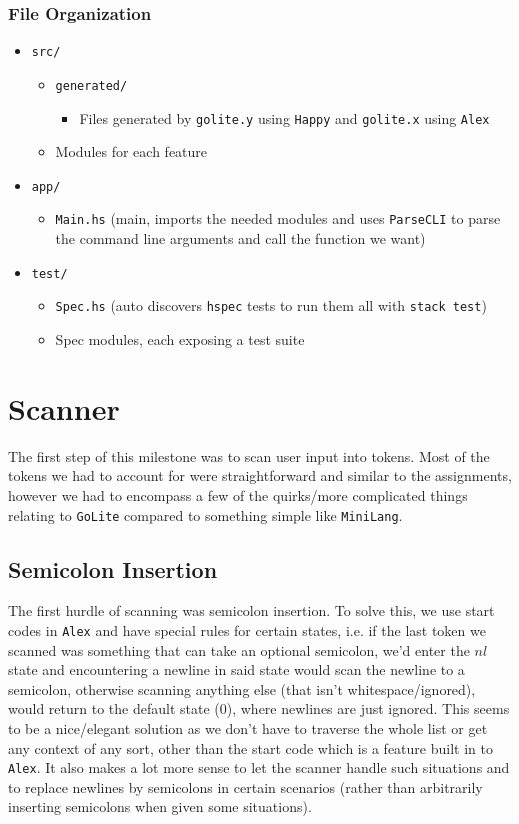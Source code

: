 \documentclass[11pt]{article}
\begin{document}
\subsubsection{File Organization}
\label{sec:orgb654ad6}
\begin{itemize}
\item \texttt{src/}
\begin{itemize}
\item \texttt{generated/}
\begin{itemize}
\item Files generated by \texttt{golite.y} using \texttt{Happy} and \texttt{golite.x} using \texttt{Alex}
\end{itemize}
\item Modules for each feature
\end{itemize}
\item \texttt{app/}
\begin{itemize}
\item \texttt{Main.hs} (main, imports the needed modules and uses
\texttt{ParseCLI} to parse the command line arguments and call the
function we want)
\end{itemize}
\item \texttt{test/}
\begin{itemize}
\item \texttt{Spec.hs} (auto discovers \texttt{hspec} tests to run them all with
\texttt{stack test})
\item Spec modules, each exposing a test suite
\end{itemize}
\end{itemize}
\section{Scanner}
\label{sec:orged9bfb2}
The first step of this milestone was to scan user input into
tokens. Most of the tokens we had to account for were straightforward
and similar to the assignments, however we had to encompass a few of
the quirks/more complicated things relating to \texttt{GoLite} compared to
something simple like \texttt{MiniLang}.
\subsection{Semicolon Insertion}
\label{sec:orgd8a7f1d}
The first hurdle of scanning was semicolon insertion. To solve
this, we use start codes in \texttt{Alex} and have special rules for
certain states, i.e. if the last token we scanned was something
that can take an optional semicolon, we'd enter the \(nl\) state and
encountering a newline in said state would scan the newline to a
semicolon, otherwise scanning anything else (that isn't
whitespace/ignored), would return to the default state (\(0\)), where
newlines are just ignored. This seems to be a nice/elegant solution
as we don't have to traverse the whole list or get any context of
any sort, other than the start code which is a feature built in to
\texttt{Alex}. It also makes a lot more sense to let the scanner handle
such situations and to replace newlines by semicolons in certain
scenarios (rather than arbitrarily inserting semicolons when given
some situations).
\end{document}

